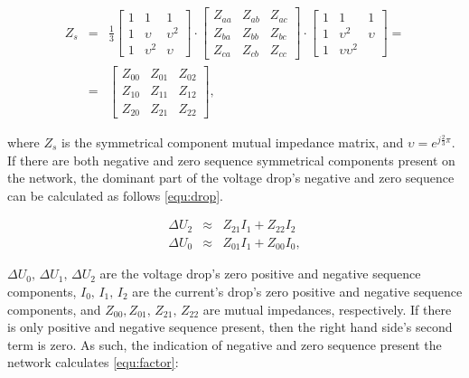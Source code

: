             \begin{equation}
                \begin{array}{rcl}
                       Z_s&=&\frac{1}{3}\begin{bmatrix} 1&1&1\\1&\upsilon&\upsilon^2\\1&\upsilon^2&\upsilon \end{bmatrix}\cdot
                                        \begin{bmatrix} Z_{aa}&Z_{ab}&Z_{ac}\\Z_{ba}&Z_{bb}&Z_{bc}\\Z_{ca}&Z_{cb}&Z_{cc} \end{bmatrix}\cdot
                                        \begin{bmatrix} 1&1&1\\1&\upsilon^2&\upsilon\\1&\upsilon\upsilon^2\end{bmatrix}=\\
                          &=&  \begin{bmatrix} Z_{00}&Z_{01}&Z_{02}\\Z_{10}&Z_{11}&Z_{12}\\Z_{20}&Z_{21}&Z_{22} \end{bmatrix},

                \end{array}
                \label{equ:mutual}
            \end{equation}

where $Z_s$ is the symmetrical component mutual impedance matrix, and $\upsilon=e^{j\frac{2}{3}\pi}$. If there are both negative and zero sequence symmetrical components present on the network, the dominant part of the voltage drop's negative and zero sequence can be calculated as follows \ref{equ:drop}.

            \begin{equation}
                \begin{array}{rcl}
                       \Delta U_2&\approx&Z_{21}I_1+Z_{22}I_2\\
                       \Delta U_0&\approx&Z_{01}I_1+Z_{00}I_0,
                \end{array}
                \label{equ:drop}
            \end{equation}

$\Delta U_0,\,\Delta U_1,\,\Delta U_2$ are the voltage drop's zero positive and negative sequence components, $I_0,\,I_1,\,I_2$ are the current's drop's zero positive and negative sequence components, and $Z_{00},Z_{01},\,Z_{21},\,Z_{22}$ are mutual impedances,  respectively. If there is only positive and negative sequence present, then the right hand side's second term is zero. As such, the indication of negative and zero sequence present the network calculates \ref{equ:factor}:


